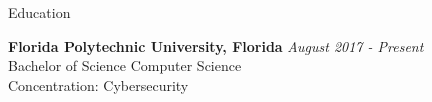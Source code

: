 \documentclass{resume} %
\begin{document}

\begin{rSection}{Education}

{\bf Florida Polytechnic University, Florida} \hfill {\em August 2017 - Present} 
\\ Bachelor of Science Computer Science
\\ Concentration: Cybersecurity\\

\end{rSection}
\end{document}
